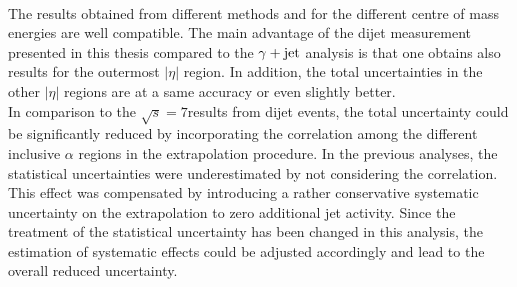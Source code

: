 \\
The results obtained from different methods and for the different centre of mass energies are well compatible. The main advantage of the dijet measurement presented in this thesis compared to the $\gamma +\rm{jet}$ analysis is that one obtains also results for the outermost $|\eta|$ region. In addition, the total uncertainties in the other $|\eta|$ regions are at a same accuracy or even slightly better. \\
In comparison to the $\sqrt{s}=7$\tev results from dijet events, the total uncertainty could be significantly reduced by incorporating the correlation among the different inclusive $\alpha$ regions in the extrapolation procedure. In the previous analyses, the statistical uncertainties were underestimated by not considering the correlation. This effect was compensated by introducing a rather conservative systematic uncertainty on the extrapolation to zero additional jet activity. Since the treatment of the statistical uncertainty has been changed in this analysis, the estimation of systematic effects could be adjusted accordingly and lead to the overall reduced uncertainty.

